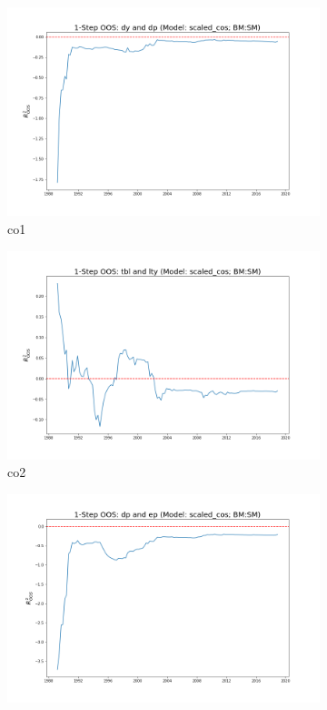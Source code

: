 \documentclass[a4paper,12pt,times,numbered,print,index]{report}
\numberwithin{equation}{section}
\begin{document}
\begin{figure}[!htbp]
	\centering
	\caption{OOS Results for Model with $f_4$}
	\begin{subfigure}[b]{0.42\linewidth}
		\includegraphics[width=0.9\linewidth]{OOS_plots/scaled_cos_co1_SM.png}
		\caption{co1}
	\end{subfigure}
	\begin{subfigure}[b]{0.42\linewidth}
		\includegraphics[width=0.9\linewidth]{OOS_plots/scaled_cos_co2_SM.png}
		\caption{co2}
	\end{subfigure}
	\begin{subfigure}[b]{0.42\linewidth}
		\includegraphics[width=0.9\linewidth]{OOS_plots/scaled_cos_co3_SM.png}

\end{subfigure}
\end{figure}
\end{document}
